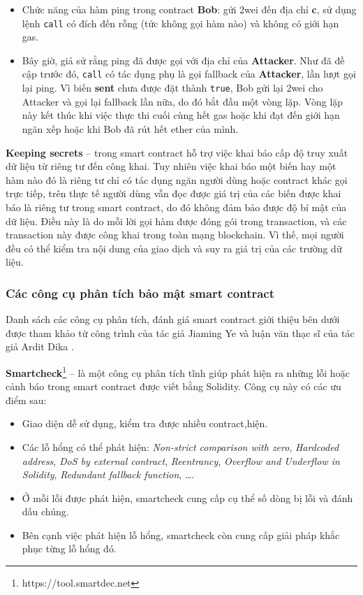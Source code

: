 \documentclass[../main-report.tex]{subfiles}
\begin{document}
\begin{itemize}
\item Chức năng của hàm ping trong contract \textbf{Bob}: gửi 2wei đến địa chỉ \textbf{c}, sử dụng lệnh \texttt{call} có đích đến rỗng (tức không gọi hàm nào) và không có giới hạn gas.
\item Bây giờ, giả sử rằng ping đã được gọi với địa chỉ của \textbf{Attacker}. Như đã đề cập trước đó, \texttt{call} có tác dụng phụ là gọi fallback của \textbf{Attacker}, lần lượt gọi lại ping. Vì biến \textbf{sent} chưa được đặt thành \texttt{true}, Bob gửi lại 2wei cho Attacker và gọi lại fallback lần nữa, do đó bắt đầu một vòng lặp. Vòng lặp này kết thúc khi việc thực thi cuối cùng hết gas hoặc khi đạt đến giới hạn ngăn xếp hoặc khi Bob đã rút hết ether của mình.
\end{itemize}

\textbf{Keeping secrets} -- trong smart contract hỗ trợ việc khai báo cấp độ truy xuất dữ liệu từ riêng tư đến công khai. Tuy nhiên việc khai báo một biến hay một hàm nào đó là riêng tư chỉ có tác dụng ngăn người dùng hoặc contract khác gọi trực tiếp, trên thực tế người dùng vẫn đọc được giá trị của các biến được khai báo là riêng tư trong smart contract, do đó không đảm bảo được độ bí mật của dữ liệu. Điều này là do mỗi lời gọi hàm được đóng gói trong transaction, và các transaction này được công khai trong toàn mạng blockchain. Vì thế, mọi người đều có thể kiểm tra nội dung của giao dịch và suy ra giá trị của các trường dữ liệu.

\subsubsection{Các công cụ phân tích bảo mật smart contract}
\label{sec:smartcontract-vuln}
Danh sách các công cụ phân tích, đánh giá smart contract giới thiệu bên dưới được tham khảo từ công trình của tác giả Jiaming Ye \cite{8728953} và luận văn thạc sĩ của tác giả Ardit Dika \cite{dika2017ethereum}.

\textbf{Smartcheck}\footnote{https://tool.smartdec.net} -- là một công cụ phân tích tĩnh giúp phát hiện ra những lỗi hoặc cảnh báo trong smart contract được viết bằng Solidity. Công cụ này có các ưu điểm sau:

\begin{itemize}
\item Giao diện dễ sử dụng, kiểm tra được nhiều contract,hiện.
\item Các lỗ hổng có thể phát hiện: \textit{Non-strict comparison with zero}, \textit{Hardcoded address},  \textit{DoS by external contract}, \textit{Reentrancy}, \textit{Overflow and Underflow in Solidity}, \textit{Redundant fallback function}, \ldots.
\item Ở mỗi lỗi được phát hiện, smartcheck cung cấp cụ thể số dòng bị lỗi và đánh dấu chúng.
\item Bên cạnh việc phát hiện lỗ hổng, smartcheck còn cung cấp giải pháp khắc phục từng lỗ hổng đó.
\end{itemize}
\end{document}
